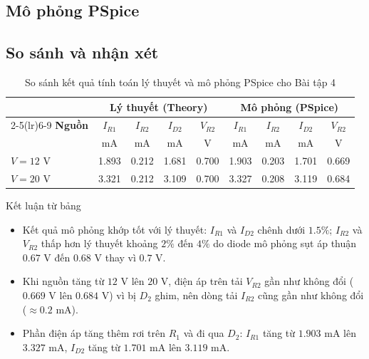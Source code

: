 \Needspace{0.66\textheight}
\subsection{Mô phỏng PSpice}
\simresult
{}

\subsection{So sánh và nhận xét}
\begin{table}[H]
  \centering
  \caption{So sánh kết quả tính toán lý thuyết và mô phỏng PSpice cho Bài tập 4}
  \small
  \setlength{\tabcolsep}{3.5pt}
  \begin{tabular}{lcccccccc}
    \toprule
    & \multicolumn{4}{c}{\textbf{Lý thuyết (Theory)}} & \multicolumn{4}{c}{\textbf{Mô phỏng (PSpice)}} \\
    \cmidrule(lr){2-5}\cmidrule(lr){6-9}
    \textbf{Nguồn} & $I_{R1}$ & $I_{R2}$ & $I_{D2}$ & $V_{R2}$ & $I_{R1}$ & $I_{R2}$ & $I_{D2}$ & $V_{R2}$ \\
    & {\scriptsize mA} & {\scriptsize mA} & {\scriptsize mA} & {\scriptsize V} & {\scriptsize mA} & {\scriptsize mA} & {\scriptsize mA} & {\scriptsize V} \\
    \midrule
    $V = 12\text{ V}$ & 1.893 & 0.212 & 1.681 & 0.700 & 1.903 & 0.203 & 1.701 & 0.669 \\
    $V = 20\text{ V}$ & 3.321 & 0.212 & 3.109 & 0.700 & 3.327 & 0.208 & 3.119 & 0.684 \\
    \bottomrule
  \end{tabular}
\end{table}

\begin{notebox}{Kết luận từ bảng}
\begin{itemize}[leftmargin=1.5em,itemsep=2pt,topsep=0pt]
  \item Kết quả mô phỏng khớp tốt với lý thuyết: $I_{R1}$ và $I_{D2}$ chênh dưới $1.5\%$; $I_{R2}$ và $V_{R2}$ thấp hơn lý thuyết khoảng $2\%$ đến $4\%$ do diode mô phỏng sụt áp thuận $0.67\text{ V}$ đến $0.68\text{ V}$ thay vì $0.7\text{ V}$.
  \item Khi nguồn tăng từ $12\text{ V}$ lên $20\text{ V}$, điện áp trên tải $V_{R2}$ gần như không đổi ($0.669\text{ V}$ lên $0.684\text{ V}$) vì bị $D_2$ ghim, nên dòng tải $I_{R2}$ cũng gần như không đổi ($\approx 0.2\text{ mA}$).
  \item Phần điện áp tăng thêm rơi trên $R_1$ và đi qua $D_2$: $I_{R1}$ tăng từ $1.903\text{ mA}$ lên $3.327\text{ mA}$, $I_{D2}$ tăng từ $1.701\text{ mA}$ lên $3.119\text{ mA}$.
\end{itemize}
\end{notebox}
